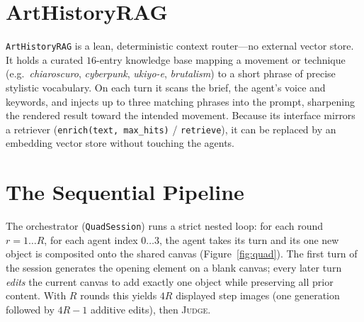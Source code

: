 \documentclass[11pt]{article}
\newcommand{\code}[1]{\texttt{\small #1}}
\newcommand{\JUDGE}{\textsc{Judge}}
\newcommand{\RAG}{\code{ArtHistoryRAG}}
\begin{document}
\section{ArtHistoryRAG}
\label{sec:rag}
\RAG{} is a lean, deterministic context router---no external vector store. It
holds a curated $16$-entry knowledge base mapping a movement or technique
(e.g.\ \emph{chiaroscuro}, \emph{cyberpunk}, \emph{ukiyo-e}, \emph{brutalism}) to a
short phrase of precise stylistic vocabulary. On each turn it scans the brief,
the agent's voice and keywords, and injects up to three matching phrases into the
prompt, sharpening the rendered result toward the intended movement. Because its
interface mirrors a retriever (\code{enrich(text, max\_hits)} / \code{retrieve}),
it can be replaced by an embedding vector store \citep{lewis2020retrieval} without
touching the agents.

\section{The Sequential Pipeline}
\label{sec:pipeline}
The orchestrator (\code{QuadSession}) runs a strict nested loop: for each round
$r=1\dots R$, for each agent index $0\dots 3$, the agent takes its turn and its
one new object is composited onto the shared canvas (Figure~\ref{fig:quad}). The
first turn of the session generates the opening element on a blank canvas; every
later turn \emph{edits} the current canvas to add exactly one object while
preserving all prior content. With $R$ rounds this yields $4R$ displayed step
images (one generation followed by $4R-1$ additive edits), then \JUDGE{}.
\end{document}
